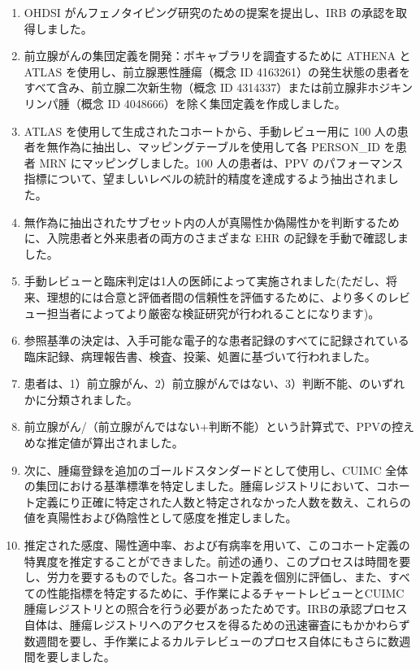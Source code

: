 \documentclass[
  11pt]{book}
\theoremstyle{definition}
\theoremstyle{definition}
\theoremstyle{definition}
\theoremstyle{definition}
\theoremstyle{remark}
\begin{document}
\begin{enumerate}
\def\labelenumi{\arabic{enumi}.}
\item
  OHDSI がんフェノタイピング研究のための提案を提出し、IRB の承認を取得しました。
\item
  前立腺がんの集団定義を開発：ボキャブラリを調査するために ATHENA と ATLAS を使用し、前立腺悪性腫瘍（概念 ID 4163261）の発生状態の患者をすべて含み、前立腺二次新生物（概念 ID 4314337）または前立腺非ホジキンリンパ腫（概念 ID 4048666）を除く集団定義を作成しました。
\item
  ATLAS を使用して生成されたコホートから、手動レビュー用に 100 人の患者を無作為に抽出し、マッピングテーブルを使用して各 PERSON\_ID を患者 MRN にマッピングしました。100 人の患者は、PPV のパフォーマンス指標について、望ましいレベルの統計的精度を達成するよう抽出されました。
\item
  無作為に抽出されたサブセット内の人が真陽性か偽陽性かを判断するために、入院患者と外来患者の両方のさまざまな EHR の記録を手動で確認しました。
\item
  手動レビューと臨床判定は1人の医師によって実施されました(ただし、将来、理想的には合意と評価者間の信頼性を評価するために、より多くのレビュー担当者によってより厳密な検証研究が行われることになります)。
\item
  参照基準の決定は、入手可能な電子的な患者記録のすべてに記録されている臨床記録、病理報告書、検査、投薬、処置に基づいて行われました。
\item
  患者は、1）前立腺がん、2）前立腺がんではない、3）判断不能、のいずれかに分類されました。
\item
  前立腺がん/（前立腺がんではない+判断不能）という計算式で、PPVの控えめな推定値が算出されました。
\item
  次に、腫瘍登録を追加のゴールドスタンダードとして使用し、CUIMC 全体の集団における基準標準を特定しました。腫瘍レジストリにおいて、コホート定義にり正確に特定された人数と特定されなかった人数を数え、これらの値を真陽性および偽陰性として感度を推定しました。
\item
  推定された感度、陽性適中率、および有病率を用いて、このコホート定義の特異度を推定することができました。前述の通り、このプロセスは時間を要し、労力を要するものでした。各コホート定義を個別に評価し、また、すべての性能指標を特定するために、手作業によるチャートレビューとCUIMC腫瘍レジストリとの照合を行う必要があったためです。IRBの承認プロセス自体は、腫瘍レジストリへのアクセスを得るための迅速審査にもかかわらず数週間を要し、手作業によるカルテレビューのプロセス自体にもさらに数週間を要しました。
\end{enumerate}
\end{document}
